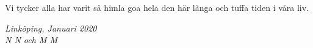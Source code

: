 \begin{acknowledgments}
  Vi tycker alla har varit så himla goa hela den här långa och tuffa tiden i våra liv.

  \addvspace{1em}
  \begin{flushright}
    \textit{%
      Linköping, Januari 2020\\
      N N och M M%
    }
  \end{flushright}
\end{acknowledgments}
